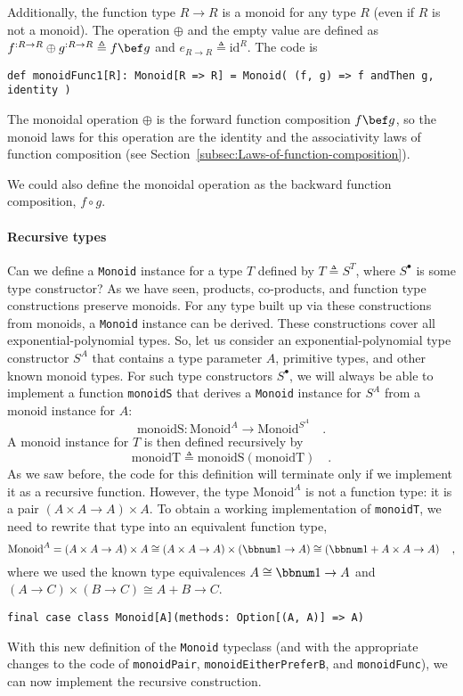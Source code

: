 Additionally, the function type $R\rightarrow R$ is a monoid for
any type $R$ (even if $R$ is not a monoid). The operation $\oplus$
and the empty value are defined as $f^{:R\rightarrow R}\oplus g^{:R\rightarrow R}\triangleq f\bef g$
and $e_{R\rightarrow R}\triangleq\text{id}^{R}$. The code is
\begin{lstlisting}
def monoidFunc1[R]: Monoid[R => R] = Monoid( (f, g) => f andThen g, identity )
\end{lstlisting}
The monoidal operation $\oplus$ is the forward function composition
$f\bef g$, so the monoid laws for this operation are the identity
and the associativity laws of function composition (see Section~\ref{subsec:Laws-of-function-composition}).

We could also define the monoidal operation as the backward function
composition, $f\circ g$. 

\paragraph{Recursive types}

Can we define a \lstinline!Monoid! instance for a type $T$ defined
by $T\triangleq S^{T}$, where $S^{\bullet}$ is some type constructor?
As we have seen, products, co-products, and function type constructions
preserve monoids. For any type built up via these constructions from
monoids, a \lstinline!Monoid! instance can be derived. These constructions
cover all exponential-polynomial types. So, let us consider an exponential-polynomial
type constructor $S^{A}$ that contains a type parameter $A$, primitive
types, and other known monoid types. For such type constructors $S^{\bullet}$,
we will always be able to implement a function \lstinline!monoidS!
that derives a \lstinline!Monoid! instance for $S^{A}$ from a monoid
instance for $A$:
\[
\text{monoidS}:\text{Monoid}^{A}\rightarrow\text{Monoid}^{S^{A}}\quad.
\]
A monoid instance for $T$ is then defined recursively by
\[
\text{monoidT}\triangleq\text{monoidS}\left(\text{monoidT}\right)\quad.
\]
As we saw before, the code for this definition will terminate only
if we implement it as a recursive function. However, the type $\text{Monoid}^{A}$
is not a function type: it is a pair $\left(A\times A\rightarrow A\right)\times A$.
To obtain a working implementation of \lstinline!monoidT!, we need
to rewrite that type into an equivalent function type,
\[
\text{Monoid}^{A}=\left(A\times A\rightarrow A\right)\times A\cong\left(A\times A\rightarrow A\right)\times\left(\bbnum 1\rightarrow A\right)\cong\left(\bbnum 1+A\times A\rightarrow A\right)\quad,
\]
where we used the known type equivalences $A\cong\bbnum 1\rightarrow A$
and $\left(A\rightarrow C\right)\times\left(B\rightarrow C\right)\cong A+B\rightarrow C$.
\begin{lstlisting}
final case class Monoid[A](methods: Option[(A, A)] => A)
\end{lstlisting}
With this new definition of the \lstinline!Monoid! typeclass (and
with the appropriate changes to the code of \lstinline!monoidPair!,
\lstinline!monoidEitherPreferB!, and \lstinline!monoidFunc!), we
can now implement the recursive construction.

